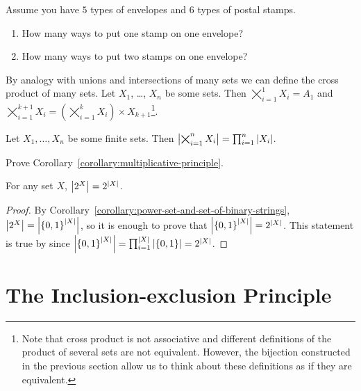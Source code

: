 \begin{exercise}
  Assume you have $5$ types of envelopes and $6$ types of postal stamps.
  \begin{enumerate}
    \item How many ways to put one stamp on one envelope?
    \item How many ways to put two stamps on one envelope?
  \end{enumerate}
\end{exercise}

By analogy with unions and intersections of many sets we can define the cross
product of many sets.
Let $X_1$, \dots, $X_n$ be some sets. Then $\bigtimes_{i = 1}^1 X_i = A_1$ and
$\bigtimes_{i = 1}^{k + 1} X_i =
  \left(\bigtimes_{i = 1}^k X_i\right) \times X_{k + 1}$\footnote{%
    Note that cross product is not associative and different definitions of the
    product of several sets are not equivalent. However, the bijection
    constructed in the previous section allow us to think about these
    definitions as if they are equivalent.
}.

\begin{corollary}
\label{corollary:multiplicative-principle}
  Let $X_1, \dots, X_n$ be some finite sets. Then
  $\left|{\bigtimes_{i = 1}^n X_i}\right| = \prod_{i = 1}^n \left|{X_i}\right|$.
\end{corollary}

\begin{exercise}
  Prove Corollary~\ref{corollary:multiplicative-principle}.
\end{exercise}

\begin{theorem}
\label{theorem:cardinality-of-power-set}
  For any set $X$, $\cardinality{\subsets{X}} = 2^{\cardinality{X}}$.
\end{theorem}
\begin{proof}
  By Corollary~\ref{corollary:power-set-and-set-of-binary-strings},
  $\cardinality{\subsets{X}} =
  \cardinality{\functions{\cardinality{X}}{\set{0, 1}}}$, so it is enough to
  prove that $\cardinality{\set{0, 1}^{\cardinality{X}}} = \subsets{\cardinality{X}}$. 
  This statement is true by  since 
  $\cardinality{\set{0, 1}^{\cardinality{X}}} =
  \prod_{i = 1}^{\cardinality{X}} \cardinality{\set{0, 1}} = 
    2^{\cardinality{X}}$.
\end{proof}

\section{The Inclusion-exclusion Principle}

